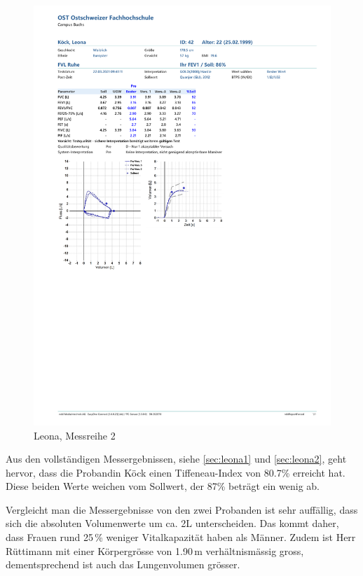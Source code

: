\documentclass[11pt]{scrartcl}
\begin{document}
        \begin{figure}[H]
        \centering
        \includegraphics[clip, trim=1cm 10cm 0cm 10.6cm, width=15cm]{Dateien/Leona2.pdf}
        \caption{Leona, Messreihe 2}
        \end{figure}


    Aus den vollständigen Messergebnissen, siehe \autoref{sec:leona1} und \autoref{sec:leona2}, geht hervor, dass die
    Probandin Köck einen Tiffeneau-Index von 80.7\% erreicht hat.
    Diese beiden Werte weichen vom Sollwert, der 87\% beträgt ein wenig ab.

    Vergleicht man die Messergebnisse von den zwei Probanden ist sehr auffällig, dass sich die absoluten Volumenwerte
    um ca. 2L unterscheiden.
    Das kommt daher, dass Frauen rund 25\,\% weniger Vitalkapazität haben als Männer.
    Zudem ist Herr Rüttimann mit einer Körpergrösse von 1.90\,m verhältnismässig gross, dementsprechend ist auch das
    Lungenvolumen grösser.
\end{document}
